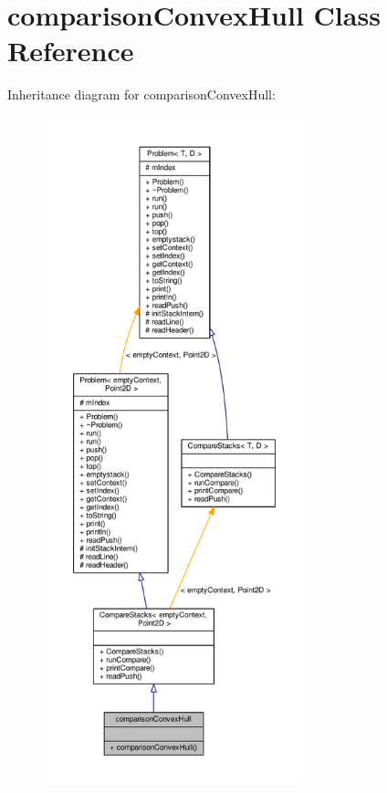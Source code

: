 \hypertarget{classcomparison_convex_hull}{}\section{comparison\+Convex\+Hull Class Reference}
\label{classcomparison_convex_hull}


Inheritance diagram for comparison\+Convex\+Hull\+:
\nopagebreak
\begin{figure}[H]
\begin{center}
\leavevmode
\includegraphics[height=550pt]{classcomparison_convex_hull__inherit__graph}
\end{center}
\end{figure}



